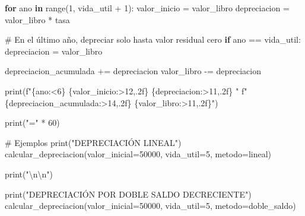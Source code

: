 \documentclass[
  doc,
  floatsintext,
  longtable,
  a4paper,
  nolmodern,
  notxfonts,
  notimes,
  12pt,
  colorlinks=true,linkcolor=blue,citecolor=blue,urlcolor=blue]{apa7}
\newenvironment{Shaded}{\begin{snugshade}}{\end{snugshade}}
\newcommand{\BuiltInTok}[1]{\textcolor[rgb]{0.00,0.23,0.31}{#1}}
\newcommand{\CharTok}[1]{\textcolor[rgb]{0.13,0.47,0.30}{#1}}
\newcommand{\CommentTok}[1]{\textcolor[rgb]{0.37,0.37,0.37}{#1}}
\newcommand{\ControlFlowTok}[1]{\textcolor[rgb]{0.00,0.23,0.31}{\textbf{#1}}}
\newcommand{\DecValTok}[1]{\textcolor[rgb]{0.68,0.00,0.00}{#1}}
\newcommand{\KeywordTok}[1]{\textcolor[rgb]{0.00,0.23,0.31}{\textbf{#1}}}
\newcommand{\NormalTok}[1]{\textcolor[rgb]{0.00,0.23,0.31}{#1}}
\newcommand{\OperatorTok}[1]{\textcolor[rgb]{0.37,0.37,0.37}{#1}}
\newcommand{\SpecialCharTok}[1]{\textcolor[rgb]{0.37,0.37,0.37}{#1}}
\newcommand{\SpecialStringTok}[1]{\textcolor[rgb]{0.13,0.47,0.30}{#1}}
\newcommand{\StringTok}[1]{\textcolor[rgb]{0.13,0.47,0.30}{#1}}
\begin{document}
\begin{Shaded}
\begin{Highlighting}[]
        \ControlFlowTok{for}\NormalTok{ ano }\KeywordTok{in} \BuiltInTok{range}\NormalTok{(}\DecValTok{1}\NormalTok{, vida\_util }\OperatorTok{+} \DecValTok{1}\NormalTok{):}
\NormalTok{            valor\_inicio }\OperatorTok{=}\NormalTok{ valor\_libro}
\NormalTok{            depreciacion }\OperatorTok{=}\NormalTok{ valor\_libro }\OperatorTok{*}\NormalTok{ tasa}
            
            \CommentTok{\# En el último año, depreciar solo hasta valor residual cero}
            \ControlFlowTok{if}\NormalTok{ ano }\OperatorTok{==}\NormalTok{ vida\_util:}
\NormalTok{                depreciacion }\OperatorTok{=}\NormalTok{ valor\_libro}
            
\NormalTok{            depreciacion\_acumulada }\OperatorTok{+=}\NormalTok{ depreciacion}
\NormalTok{            valor\_libro }\OperatorTok{{-}=}\NormalTok{ depreciacion}
            
            \BuiltInTok{print}\NormalTok{(}\SpecialStringTok{f"}\SpecialCharTok{\{}\NormalTok{ano}\SpecialCharTok{:\textless{}6\}}\SpecialStringTok{ }\SpecialCharTok{\{}\NormalTok{valor\_inicio}\SpecialCharTok{:\textgreater{}12,.2f\}}\SpecialStringTok{ }\SpecialCharTok{\{}\NormalTok{depreciacion}\SpecialCharTok{:\textgreater{}11,.2f\}}\SpecialStringTok{ "}
                  \SpecialStringTok{f"}\SpecialCharTok{\{}\NormalTok{depreciacion\_acumulada}\SpecialCharTok{:\textgreater{}14,.2f\}}\SpecialStringTok{ }\SpecialCharTok{\{}\NormalTok{valor\_libro}\SpecialCharTok{:\textgreater{}11,.2f\}}\SpecialStringTok{"}\NormalTok{)}
    
    \BuiltInTok{print}\NormalTok{(}\StringTok{"="} \OperatorTok{*} \DecValTok{60}\NormalTok{)}

\CommentTok{\# Ejemplos}
\BuiltInTok{print}\NormalTok{(}\StringTok{"DEPRECIACIÓN LINEAL"}\NormalTok{)}
\NormalTok{calcular\_depreciacion(valor\_inicial}\OperatorTok{=}\DecValTok{50000}\NormalTok{, vida\_util}\OperatorTok{=}\DecValTok{5}\NormalTok{, metodo}\OperatorTok{=}\StringTok{\textquotesingle{}lineal\textquotesingle{}}\NormalTok{)}

\BuiltInTok{print}\NormalTok{(}\StringTok{"}\CharTok{\textbackslash{}n\textbackslash{}n}\StringTok{"}\NormalTok{)}

\BuiltInTok{print}\NormalTok{(}\StringTok{"DEPRECIACIÓN POR DOBLE SALDO DECRECIENTE"}\NormalTok{)}
\NormalTok{calcular\_depreciacion(valor\_inicial}\OperatorTok{=}\DecValTok{50000}\NormalTok{, vida\_util}\OperatorTok{=}\DecValTok{5}\NormalTok{, metodo}\OperatorTok{=}\StringTok{\textquotesingle{}doble\_saldo\textquotesingle{}}\NormalTok{)}
\end{Highlighting}
\end{Shaded}
\end{document}
